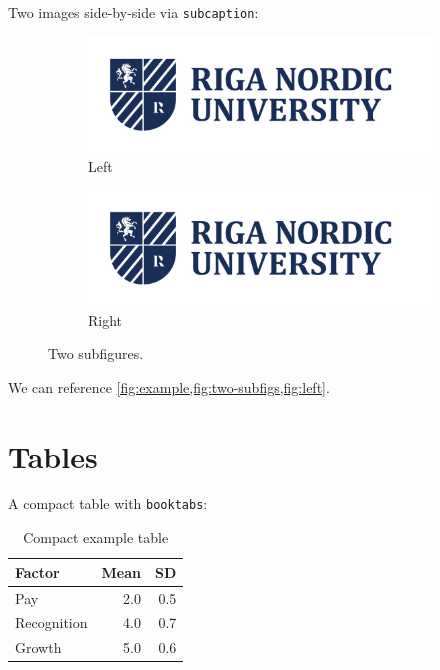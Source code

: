Two images side-by-side via \texttt{subcaption}:
\begin{figure}[h]
  \centering
  \begin{subfigure}{.47\linewidth}
    \centering
    \includegraphics[width=.9\linewidth]{b_chapters/chapter1/assets/RNU_large_logo.png}
    \caption{Left}
    \label{fig:left}
  \end{subfigure}\hfill
  \begin{subfigure}{.47\linewidth}
    \centering
    \includegraphics[width=.9\linewidth]{b_chapters/chapter1/assets/RNU_large_logo.png}
    \caption{Right}
    \label{fig:right}
  \end{subfigure}
  \caption{Two subfigures.}
  \label{fig:two-subfigs}
\end{figure}

We can reference \cref{fig:example,fig:two-subfigs,fig:left}.

\section{Tables}
A compact table with \texttt{booktabs}:
\begin{table}[h]
  \caption{Compact example table}
  \label{tab:compact}
  \centering
  \begin{tabular}{lrr}
    \toprule
    Factor & Mean & SD\\
    \midrule
    Pay           & 2.0 & 0.5\\
    Recognition   & 4.0 & 0.7\\
    Growth        & 5.0 & 0.6\\
    \bottomrule
  \end{tabular}
\end{table}

